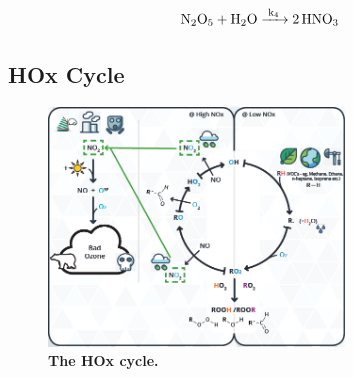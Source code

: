 \begin{equation}
  \ce{N2O5 + H2O ->[k4] 2HNO3}
  \label{eqn:hno3}
\end{equation}



\subsection{HOx Cycle}





\begin{figure}[H]
    \centering
    \includegraphics[width=0.7\textwidth]{hoxcycle.png}
    \caption{\textbf{The HOx cycle.}}
    \label{fig:hox}
\end{figure}


